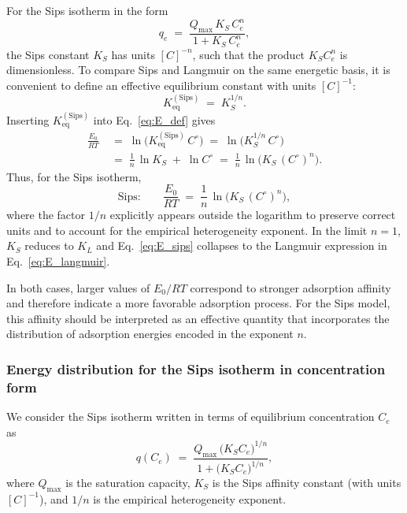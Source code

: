 \documentclass[12pt]{article}
\begin{document}
	For the Sips isotherm in the form
	\begin{equation}
		q_e \;=\; \frac{Q_{\max}\,K_S\,C_e^{n}}{1 + K_S\,C_e^{n}},
	\end{equation}
	the Sips constant \(K_S\) has units \([C]^{-n}\), such that the product \(K_S C_e^{n}\) is dimensionless. To compare Sips and Langmuir on the same energetic basis, it is convenient to define an effective equilibrium constant with units \([C]^{-1}\):
	\begin{equation}
		K_{\mathrm{eq}}^{\mathrm{(Sips)}} \;=\; K_S^{1/n}.
	\end{equation}
	Inserting \(K_{\mathrm{eq}}^{\mathrm{(Sips)}}\) into Eq.~\eqref{eq:E_def} gives
	\begin{align}
		\frac{E_0}{RT}
		\;&=\; \ln\!\big(K_{\mathrm{eq}}^{\mathrm{(Sips)}}\,C^\circ\big)
		\;=\; \ln\!\big(K_S^{1/n}\,C^\circ\big) \nonumber\\[4pt]
		\;&=\; \frac{1}{n}\,\ln K_S \;+\; \ln C^\circ
		\;=\; \frac{1}{n}\,\ln\!\big(K_S\,(C^\circ)^{n}\big).
		\label{eq:E_sips}
	\end{align}
	Thus, for the Sips isotherm,
	\begin{equation}
		\text{Sips:}\qquad
		\frac{E_0}{RT} \;=\; \frac{1}{n}\,\ln\!\big(K_S\,(C^\circ)^{n}\big),
	\end{equation}
	where the factor \(1/n\) explicitly appears outside the logarithm to preserve correct units and to account for the empirical heterogeneity exponent. In the limit \(n = 1\), \(K_S\) reduces to \(K_L\) and Eq.~\eqref{eq:E_sips} collapses to the Langmuir expression in Eq.~\eqref{eq:E_langmuir}.
	
	In both cases, larger values of \(E_0/RT\) correspond to stronger adsorption affinity and therefore indicate a more favorable adsorption process. For the Sips model, this affinity should be interpreted as an effective quantity that incorporates the distribution of adsorption energies encoded in the exponent \(n\).
	
	\subsubsection{Energy distribution for the Sips isotherm in concentration form}
	
	We consider the Sips isotherm written in terms of equilibrium concentration
	\(C_e\) as
	\begin{equation}
		q(C_e)
		\;=\;
		\frac{Q_{\max}\,\bigl(K_S C_e\bigr)^{1/n}}
		{1 + \bigl(K_S C_e\bigr)^{1/n}},
		\label{eq:Sips_C}
	\end{equation}
	where \(Q_{\max}\) is the saturation capacity, \(K_S\) is the Sips affinity
	constant (with units \([C]^{-1}\)), and \(1/n\) is the empirical
	heterogeneity exponent.
	
\end{document}
